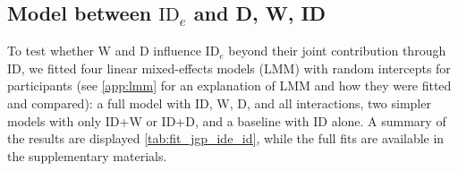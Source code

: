 \documentclass[acmlarge, manuscript,review]{acmart}
\newcommand{\mt}{\ensuremath{{\text{MT}}}\xspace}
\newcommand{\ide}{\ensuremath{{\text{ID}_e}}\xspace}
\begin{document}





\subsection{Model between \ide and D, W, ID\label{sub:jgp_id}} 
To test whether W and D influence \ide beyond their joint contribution through ID, we fitted four linear mixed-effects models (LMM) with random intercepts for participants (see \autoref{app:lmm} for an explanation of LMM and how they were fitted and compared): a full model with ID, W, D, and all interactions, two simpler models with only ID+W or ID+D, and a baseline with ID alone.
A summary of the results are displayed \autoref{tab:fit_jgp_ide_id}, while the full fits are available in the supplementary materials.
\end{document}
